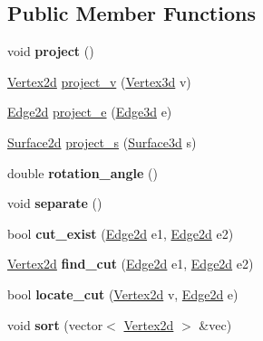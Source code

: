 \subsection*{Public Member Functions}
\begin{DoxyCompactItemize}
\item 
void {\bfseries project} ()\hypertarget{classprojection_a6a274f48a02d222f19eb058d6e54aacf}{}\label{classprojection_a6a274f48a02d222f19eb058d6e54aacf}

\item 
\hyperlink{classVertex2d}{Vertex2d} \hyperlink{classprojection_a538f0a0ffad6b4ab6280cfa5fb3b1fdb}{project\+\_\+v} (\hyperlink{classVertex3d}{Vertex3d} v)
\item 
\hyperlink{classEdge2d}{Edge2d} \hyperlink{classprojection_ae6b7e6a1773df79a6a3ca0f768699eb4}{project\+\_\+e} (\hyperlink{classEdge3d}{Edge3d} e)
\item 
\hyperlink{classSurface2d}{Surface2d} \hyperlink{classprojection_aa13c4e1c2676b918810e03f9b63d6a90}{project\+\_\+s} (\hyperlink{classSurface3d}{Surface3d} s)
\item 
double {\bfseries rotation\+\_\+angle} ()\hypertarget{classprojection_a32cfa1bcfa359224c9ec75144f77a6b4}{}\label{classprojection_a32cfa1bcfa359224c9ec75144f77a6b4}

\item 
void {\bfseries separate} ()\hypertarget{classprojection_ae2ba046447d1cf822f9f27c66e65db87}{}\label{classprojection_ae2ba046447d1cf822f9f27c66e65db87}

\item 
bool {\bfseries cut\+\_\+exist} (\hyperlink{classEdge2d}{Edge2d} e1, \hyperlink{classEdge2d}{Edge2d} e2)\hypertarget{classprojection_a13461be9eeda5f3abae6fe4f0917851a}{}\label{classprojection_a13461be9eeda5f3abae6fe4f0917851a}

\item 
\hyperlink{classVertex2d}{Vertex2d} {\bfseries find\+\_\+cut} (\hyperlink{classEdge2d}{Edge2d} e1, \hyperlink{classEdge2d}{Edge2d} e2)\hypertarget{classprojection_af38d729a67938a73090e348580ab4c0d}{}\label{classprojection_af38d729a67938a73090e348580ab4c0d}

\item 
bool {\bfseries locate\+\_\+cut} (\hyperlink{classVertex2d}{Vertex2d} v, \hyperlink{classEdge2d}{Edge2d} e)\hypertarget{classprojection_aa60b56e0c985de8508a88e42b9f139e9}{}\label{classprojection_aa60b56e0c985de8508a88e42b9f139e9}

\item 
void {\bfseries sort} (vector$<$ \hyperlink{classVertex2d}{Vertex2d} $>$ \&vec)\hypertarget{classprojection_a8732f1dd6eca7f8fe4a77fc29a8287d4}{}\label{classprojection_a8732f1dd6eca7f8fe4a77fc29a8287d4}


\end{DoxyCompactItemize}
